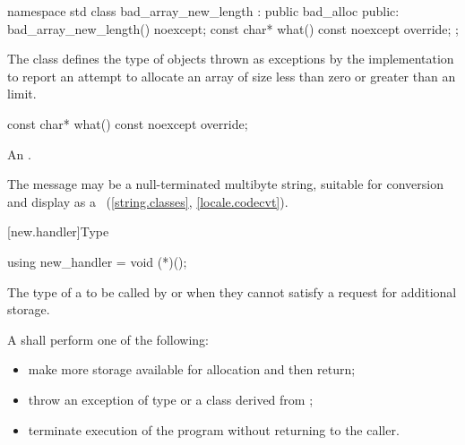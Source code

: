 \begin{codeblock}
namespace std {
  class bad_array_new_length : public bad_alloc {
  public:
    bad_array_new_length() noexcept;
    const char* what() const noexcept override;
  };
}
\end{codeblock}

\pnum
The class  defines the type of objects thrown as
exceptions by the implementation to report an attempt to allocate an array of size
less than zero or
greater than an  limit.

%
\begin{itemdecl}
const char* what() const noexcept override;
\end{itemdecl}

\begin{itemdescr}
\pnum
\returns
An  \ntbs{}.

\pnum
\remarks
The message may be a null-terminated multibyte string,
suitable for conversion and display as a
~(\ref{string.classes}, \ref{locale.codecvt}).
\end{itemdescr}

[new.handler]{Type }

%
\begin{itemdecl}
using new_handler = void (*)();
\end{itemdecl}

\begin{itemdescr}
\pnum
The type of a
to be called by
or
 when they cannot satisfy a request for additional storage.

\pnum
\required
A  shall perform one of the following:

\begin{itemize}
\item
make more storage available for allocation and then return;
\item
throw an exception of type
or a class derived from
%
;
\item
terminate execution of the program without returning to the caller.
%
%
\end{itemize}
\end{itemdescr}

